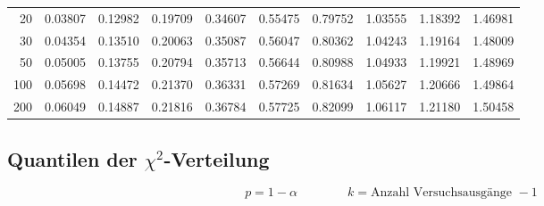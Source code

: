 \begin{center}
\begin{tabular}{|r|rrr|rrr|rrr|}
        20&0.03807&0.12982&0.19709&0.34607&0.55475&0.79752&1.03555&1.18392&1.46981\\
        30&0.04354&0.13510&0.20063&0.35087&0.56047&0.80362&1.04243&1.19164&1.48009\\
        50&0.05005&0.13755&0.20794&0.35713&0.56644&0.80988&1.04933&1.19921&1.48969\\
        100&0.05698&0.14472&0.21370&0.36331&0.57269&0.81634&1.05627&1.20666&1.49864\\
        200&0.06049&0.14887&0.21816&0.36784&0.57725&0.82099&1.06117&1.21180&1.50458\\
        \hline
    \end{tabular}
\end{center}

\vfill\null
\pagebreak

\subsection[Quantilen der chi2-Verteilung]{Quantilen der $\chi^2$-Verteilung}
\label{Quantilen der chi2-Verteilung}

$$ \boxed{ p = 1 - \alpha} \qquad \qquad \boxed{ k = \text{Anzahl Versuchsausgänge } -1 } $$

